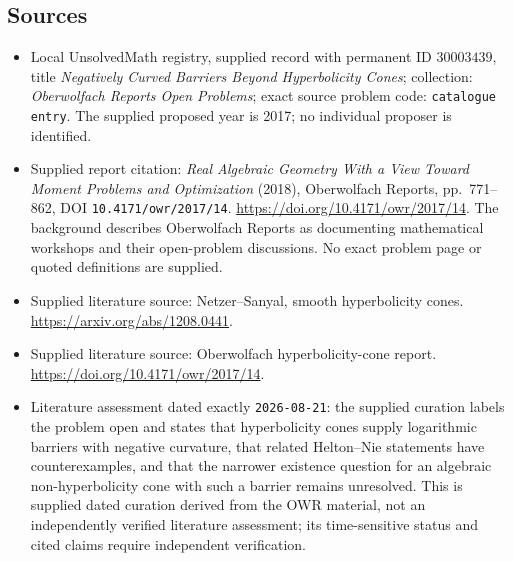 \documentclass[11pt]{article}
\begin{document}
\subsection{Sources}
\begin{itemize}
\item Local UnsolvedMath registry, supplied record with permanent ID \(30003439\), title \emph{Negatively Curved Barriers Beyond Hyperbolicity Cones}; collection: \emph{Oberwolfach Reports Open Problems}; exact source problem code: \texttt{catalogue entry}. The supplied proposed year is 2017; no individual proposer is identified.
\item Supplied report citation: \emph{Real Algebraic Geometry With a View Toward Moment Problems and Optimization} (2018), Oberwolfach Reports, pp.~771--862, DOI \texttt{10.4171/owr/2017/14}. \url{https://doi.org/10.4171/owr/2017/14}. The background describes Oberwolfach Reports as documenting mathematical workshops and their open-problem discussions. No exact problem page or quoted definitions are supplied.
\item Supplied literature source: Netzer--Sanyal, smooth hyperbolicity cones. \url{https://arxiv.org/abs/1208.0441}.
\item Supplied literature source: Oberwolfach hyperbolicity-cone report. \url{https://doi.org/10.4171/owr/2017/14}.
\item Literature assessment dated exactly \texttt{2026-08-21}: the supplied curation labels the problem open and states that hyperbolicity cones supply logarithmic barriers with negative curvature, that related Helton--Nie statements have counterexamples, and that the narrower existence question for an algebraic non-hyperbolicity cone with such a barrier remains unresolved. This is supplied dated curation derived from the OWR material, not an independently verified literature assessment; its time-sensitive status and cited claims require independent verification.
\end{itemize}
\end{document}
